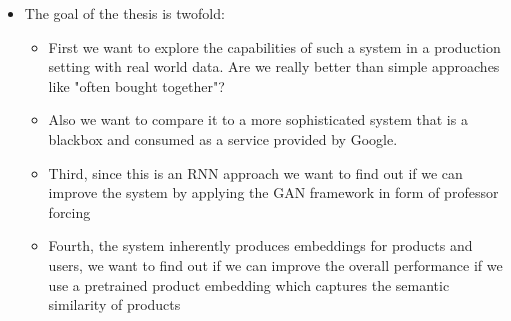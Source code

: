 \begin{itemize}
\item The goal of the thesis is twofold: 
\begin{itemize}
    \item First we want to explore the capabilities of such a system in a production setting with real world data. Are we really better than simple approaches like "often bought together"? 
    \item Also we want to compare it to a more sophisticated system that is a blackbox and consumed as a service provided by Google.
    \item Third, since this is an RNN approach we want to find out if we can improve the system by applying the GAN framework in form of professor forcing
    \item Fourth, the system inherently produces embeddings for products and users, we want to find out if we can improve the overall performance if we use a pretrained product embedding which captures the semantic similarity of products
\end{itemize} 
\end{itemize}